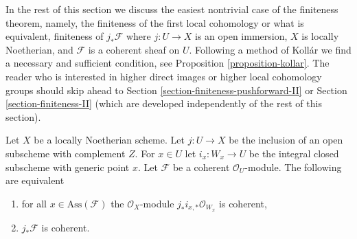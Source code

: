 \noindent
In the rest of this section we discuss the easiest nontrivial case of the
finiteness theorem, namely, the finiteness of the first local
cohomology or what is equivalent, finiteness of $j_*\mathcal{F}$
where $j : U \to X$ is an open immersion, $X$ is locally Noetherian, and
$\mathcal{F}$ is a coherent sheaf on $U$. Following a method of Koll\'ar
we find a necessary and sufficient condition, see
Proposition \ref{proposition-kollar}. The reader who is interested
in higher direct images or higher local cohomology groups should skip
ahead to Section \ref{section-finiteness-pushforward-II} or
Section \ref{section-finiteness-II} (which are developed
independently of the rest of this section).

\begin{lemma}
\label{lemma-check-finiteness-pushforward-on-associated-points}
Let $X$ be a locally Noetherian scheme. Let $j : U \to X$ be the inclusion
of an open subscheme with complement $Z$. For $x \in U$ let
$i_x : W_x \to U$ be the integral closed subscheme with generic point $x$.
Let $\mathcal{F}$ be a coherent $\mathcal{O}_U$-module.
The following are equivalent
\begin{enumerate}
\item for all $x \in \text{Ass}(\mathcal{F})$ the
$\mathcal{O}_X$-module $j_*i_{x, *}\mathcal{O}_{W_x}$ is coherent,
\item $j_*\mathcal{F}$ is coherent.
\end{enumerate}
\end{lemma}

